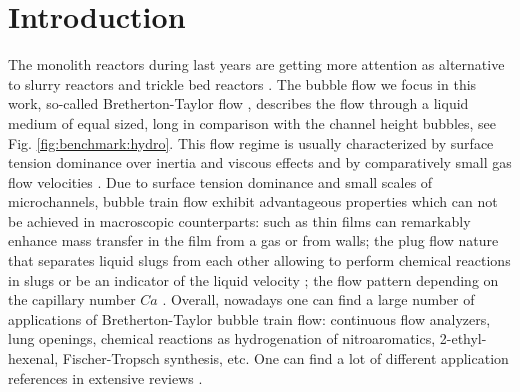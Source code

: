 \documentclass{article}
\begin{document}
\section{Introduction}
The monolith reactors during last years are getting more attention as alternative to slurry
reactors and trickle bed reactors \cite{kreutzer-overview,bercic-mass}. The bubble flow we focus in
this work, so-called Bretherton-Taylor flow \cite{bretherton,taylor}, describes the flow through
a liquid medium of equal sized, long in comparison with the channel height bubbles, see
Fig. \ref{fig:benchmark:hydro}. This flow regime
is usually characterized by surface tension dominance over inertia and viscous effects and by
comparatively small gas flow velocities \cite{yue-mass}. Due to surface tension dominance and small
scales of microchannels, bubble train flow exhibit advantageous properties which can not be achieved
in macroscopic counterparts: such as thin films \cite{bretherton} can remarkably enhance mass
transfer in the film from a gas or from walls; the plug flow nature that separates liquid slugs from each
other allowing to perform chemical reactions in slugs \cite{kreutzer-overview} or be an indicator of
the liquid velocity \cite{taylor}; the flow pattern depending on the capillary number $Ca$
\cite{heil-bretherton,heil-threedim}.  Overall, nowadays one can find a large number of applications
of Bretherton-Taylor bubble train flow: continuous flow analyzers, lung openings, chemical reactions
as hydrogenation of nitroaromatics, 2-ethyl-hexenal, Fischer-Tropsch synthesis, etc. One can find a
lot of different application references in extensive reviews \cite{kreutzer-overview,
gupta-review,yue-mass}. 
\end{document}
